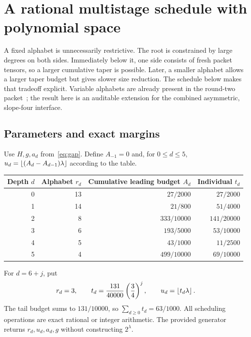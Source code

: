 \section{A rational multistage schedule with polynomial space}\label{sec:polyschedule}
A fixed alphabet is unnecessarily restrictive. The root is constrained by
large degrees on both sides. Immediately below it, one side consists of
fresh packet tensors, so a larger cumulative taper is possible. Later, a
smaller alphabet allows a larger taper budget but gives slower size reduction.
The schedule below makes that tradeoff explicit. Variable alphabets are
already present in the round-two packet~\cite{roundtwo}; the result here is
an auditable extension for the combined asymmetric, slope-four interface.

\subsection{Parameters and exact margins}
Use $H,g,a_d$ from~\eqref{eq:gap}. Define $A_{-1}=0$ and, for $0\le d\le5$,
$u_d=\left\lfloor(A_d-A_{d-1})\lambda\right\rfloor$ according to the table.
\begin{center}
\begin{tabular}{@{}rrrr@{}}
\toprule
Depth $d$ & Alphabet $r_d$ & Cumulative leading budget $A_d$ & Individual $t_d$\\
\midrule
0 & 13 & $27/2000$ & $27/2000$\\
1 & 14 & $21/800$ & $51/4000$\\
2 & 8 & $333/10000$ & $141/20000$\\
3 & 6 & $193/5000$ & $53/10000$\\
4 & 5 & $43/1000$ & $11/2500$\\
5 & 4 & $499/10000$ & $69/10000$\\
\bottomrule
\end{tabular}
\end{center}
For $d=6+j$, put
\begin{equation}\label{eq:poly-tail}
 r_d=3,\qquad t_d=\frac{131}{40000}\left(\frac34\right)^j,
 \qquad u_d=\left\lfloor t_d\lambda\right\rfloor.
\end{equation}
The tail budget sums to $131/10000$, so $\sum_{d\ge0}t_d=63/1000$.
All scheduling operations are exact rational or integer arithmetic. The
provided generator returns $r_d,u_d,a_d,g$ without constructing $2^\lambda$.

